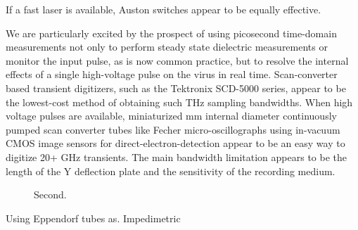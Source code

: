 \documentclass[paper.tex]{subfiles}
\begin{document}
If a fast laser is available, Auston switches appear to be equally effective.

We are particularly excited by the prospect of using picosecond time-domain measurements not only to perform steady state dielectric measurements or monitor the input pulse, as is now common practice, but to resolve the internal effects of a single high-voltage pulse on the virus in real time. Scan-converter based transient digitizers, such as the Tektronix SCD-5000 series, appear to be the lowest-cost method of obtaining such THz sampling bandwidths. When high voltage pulses are available, miniaturized  mm internal diameter continuously pumped scan converter tubes like Fecher micro-oscillographs using in-vacuum CMOS image sensors for direct-electron-detection appear to be an easy way to digitize 20+ GHz transients. The main bandwidth limitation appears to be the length of the Y deflection plate and the sensitivity of the recording medium.

\begin{figure}[H]
	\centering

	\caption{Second.}
	\hfill
	
\end{figure}


Using Eppendorf tubes as. Impedimetric 
\end{document}
